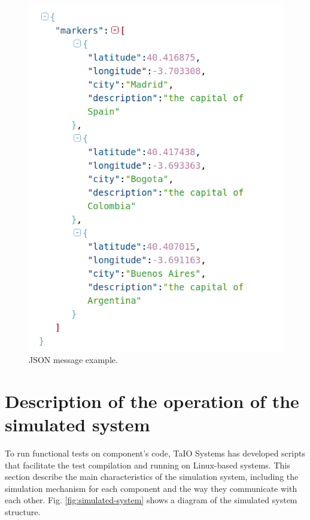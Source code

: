 \documentclass[journal]{IEEEtran}	%
\begin{document}
\begin{figure}[t!]
\centering
\includegraphics[width=0.8\columnwidth]{fig11.png}
\caption{JSON message example.}
\label{fig:json}
\end{figure}


\section{Description of the operation of the simulated system}


To run functional tests on component's code, TaIO Systems has developed scripts that facilitate the test compilation and running on Linux-based systems. This section describe the main characteristics of the simulation system, including the simulation mechanism for each component and the way they communicate with each other. Fig. \ref{fig:simulated-system} shows a diagram of the simulated system structure.
\end{document}
